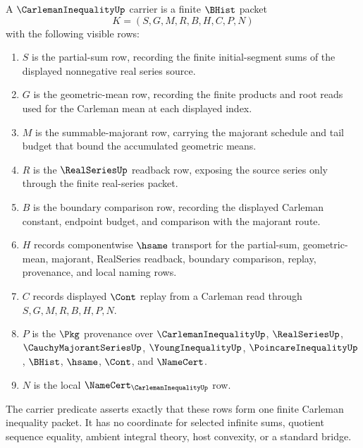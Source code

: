 \begin{definition}\label{def:carleman-inequality-carrier}
A $\CarlemanInequalityUp$ carrier is a finite $\BHist$ packet
$$
K=(S,G,M,R,B,H,C,P,N)
$$
with the following visible rows:
\begin{enumerate}
\item $S$ is the partial-sum row, recording the finite initial-segment sums of the displayed nonnegative real series source.
\item $G$ is the geometric-mean row, recording the finite products and root reads used for the Carleman mean at each displayed index.
\item $M$ is the summable-majorant row, carrying the majorant schedule and tail budget that bound the accumulated geometric means.
\item $R$ is the $\RealSeriesUp$ readback row, exposing the source series only through the finite real-series packet.
\item $B$ is the boundary comparison row, recording the displayed Carleman constant, endpoint budget, and comparison with the majorant route.
\item $H$ records componentwise $\hsame$ transport for the partial-sum, geometric-mean, majorant, RealSeries readback, boundary comparison, replay, provenance, and local naming rows.
\item $C$ records displayed $\Cont$ replay from a Carleman read through $S,G,M,R,B,H,P,N$.
\item $P$ is the $\Pkg$ provenance over $\CarlemanInequalityUp$, $\RealSeriesUp$, $\CauchyMajorantSeriesUp$, $\YoungInequalityUp$, $\PoincareInequalityUp$, $\BHist$, $\hsame$, $\Cont$, and $\NameCert$.
\item $N$ is the local $\NameCert_{\CarlemanInequalityUp}$ row.
\end{enumerate}
The carrier predicate asserts exactly that these rows form one finite Carleman inequality packet. It has no coordinate for selected infinite sums, quotient sequence equality, ambient integral theory, host convexity, or a standard bridge.
\end{definition}

